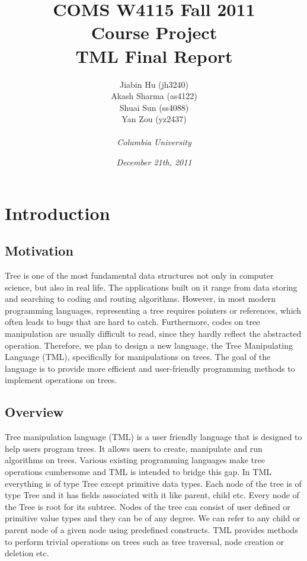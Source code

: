 \documentclass[12pt,psfig,a4]{article}
\begin{document}
 
\pagestyle{plain} 
\newenvironment{code}
{\sffamily
 \setlength{\parskip}{0pt}
}
{}

\title{\vspace{2in}\textbf{
COMS W4115 Fall 2011\\
Course Project\\
TML Final Report}}
\author{
Jiabin Hu (jh3240)\\
Akash Sharma (as4122)\\
Shuai Sun (ss4088)\\
Yan Zou (yz2437)\\\\
\textit{Columbia University}
}
\date{\textit{December 21th, 2011}}
\maketitle

\pagebreak
\tableofcontents


\pagebreak
\section{Introduction}

\subsection{Motivation}
Tree is one of the most fundamental data structures not only in computer science, but also in real life. The applications built on it range from data storing and searching to coding and routing algorithms. However, in most modern programming languages, representing a tree requires pointers or references, which often leads to bugs that are hard to catch. Furthermore, codes on tree manipulation are usually difficult to read, since they hardly reflect the abstracted operation. Therefore, we plan to design a new language, the Tree Manipulating Language (TML), specifically for manipulations on trees. The goal of the language is to provide more efficient and user-friendly programming methods to implement operations on trees.

\subsection{Overview}
Tree manipulation language (TML) is a user friendly language that is designed to help users program trees. It allows users to create, manipulate and run algorithms on trees. Various existing programming languages make tree operations cumbersome and TML is intended to bridge this gap. In TML everything is of type Tree except primitive data types. Each node of the tree is of type Tree and it has fields associated with it like parent, child etc. Every node of the Tree is root for its subtree. Nodes of the tree can consist of user defined or primitive value types and they can be of any degree. We can refer to any child or parent node of a given node using predefined constructs. TML provides methods to perform trivial operations on trees such as tree traversal, node creation or deletion etc.
\end{document}
